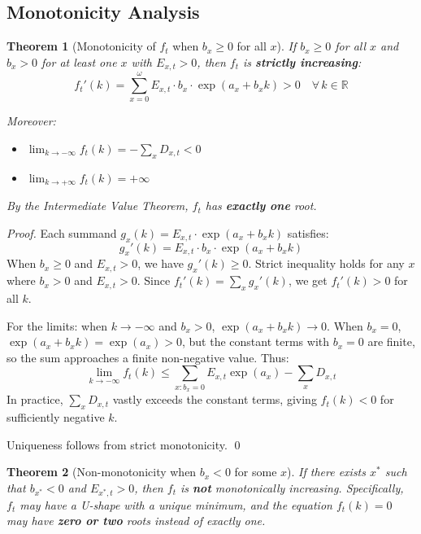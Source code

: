 \documentclass[11pt,a4paper]{article}
\newtheorem{theorem}{Theorem}[section]
\theoremstyle{definition}
\newcommand{\R}{\mathbb{R}}
\begin{document}
\subsection{Monotonicity Analysis}

\begin{theorem}[Monotonicity of $f_t$ when $b_x \geq 0$ for all $x$]
\label{thm:monotone}
If $b_x \geq 0$ for all $x$ and $b_x > 0$ for at least one $x$ with
$E_{x,t} > 0$, then $f_t$ is \textbf{strictly increasing}:
\begin{equation}
  f_t'(k) = \sum_{x=0}^{\omega} E_{x,t} \cdot b_x \cdot \exp(a_x + b_x k) > 0
  \quad \forall\, k \in \R
  \label{eq:monotone-derivative}
\end{equation}

Moreover:
\begin{itemize}
  \item $\lim_{k \to -\infty} f_t(k) = -\sum_x D_{x,t} < 0$
  \item $\lim_{k \to +\infty} f_t(k) = +\infty$
\end{itemize}

By the Intermediate Value Theorem, $f_t$ has \textbf{exactly one} root.
\end{theorem}

\begin{proof}
Each summand $g_x(k) = E_{x,t} \cdot \exp(a_x + b_x k)$ satisfies:
\[
  g_x'(k) = E_{x,t} \cdot b_x \cdot \exp(a_x + b_x k)
\]
When $b_x \geq 0$ and $E_{x,t} > 0$, we have $g_x'(k) \geq 0$.
Strict inequality holds for any $x$ where $b_x > 0$ and $E_{x,t} > 0$.
Since $f_t'(k) = \sum_x g_x'(k)$, we get $f_t'(k) > 0$ for all $k$.

For the limits: when $k \to -\infty$ and $b_x > 0$, $\exp(a_x + b_x k) \to 0$.
When $b_x = 0$, $\exp(a_x + b_x k) = \exp(a_x) > 0$, but the constant
terms with $b_x = 0$ are finite, so the sum approaches a finite
non-negative value. Thus:
\[
  \lim_{k \to -\infty} f_t(k) \leq \sum_{x: b_x=0} E_{x,t}\exp(a_x) - \sum_x D_{x,t}
\]
In practice, $\sum_x D_{x,t}$ vastly exceeds the constant terms, giving
$f_t(k) < 0$ for sufficiently negative $k$.

Uniqueness follows from strict monotonicity. \qed
\end{proof}

\begin{theorem}[Non-monotonicity when $b_x < 0$ for some $x$]
\label{thm:non-monotone}
If there exists $x^*$ such that $b_{x^*} < 0$ and $E_{x^*,t} > 0$,
then $f_t$ is \textbf{not} monotonically increasing. Specifically, $f_t$
may have a U-shape with a unique minimum, and the equation $f_t(k) = 0$
may have \textbf{zero or two} roots instead of exactly one.
\end{theorem}
\end{document}
